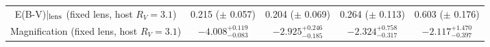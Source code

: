 \begin{table*}
{\begin{tabular}{|c|c|c|c|c|}
E(B-V)|$_{\rm lens}$ (fixed lens, host $R_V = 3.1$)  &  0.215 ($\pm$ 0.057) &  0.204 ($\pm$ 0.069) & 0.264 ($\pm$ 0.113) & 0.603 ($\pm$ 0.176) \\


Magnification (fixed lens, host $R_V = 3.1$) & 
{\bf $-4.008^{+0.119}_{-0.083}$} & {\bf $-2.925^{+ 0.246}_{-0.185}$} & {\bf $-2.324^{+0.758}_{-0.317}$} & {\bf $-2.117^{+1.470}_{-0.397}$ }
\\

\hline
\end{tabular}}
\label{tab:params}
\end{table*}